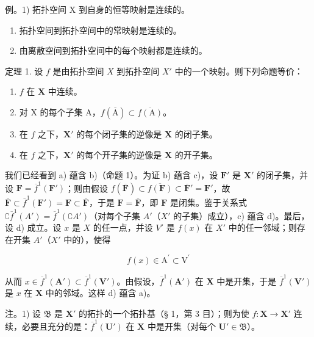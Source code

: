例。1) 拓扑空间 X 到自身的恒等映射是连续的。

\begin{enumerate}
\def\labelenumi{\arabic{enumi})}
\setcounter{enumi}{1}
\item
  拓扑空间到拓扑空间中的常映射是连续的。
\item
  由离散空间到拓扑空间中的每个映射都是连续的。
\end{enumerate}

定理 1. 设 \(f\) 是由拓扑空间 \(X\) 到拓扑空间 \(X'\) 中的一个映射。则下列命题等价：

\begin{enumerate}
\def\labelenumi{\alph{enumi})}
\item
  \(f\) 在 \(\mathbf{X}\) 中连续。
\item
  对 X 的每个子集 A，\(f(\overline{\mathrm{A}}) \subset \overline{f(\mathrm{A})}\)。
\item
  在 \(f\) 之下，\(\mathbf{X}'\) 的每个闭子集的逆像是 \(\mathbf{X}\) 的闭子集。
\item
  在 \(f\) 之下，\(\mathbf{X}'\) 的每个开子集的逆像是 \(\mathbf{X}\) 的开子集。
\end{enumerate}

我们已经看到 a) 蕴含 b)（命题 1）。为证 b) 蕴含 c)，设 \(\mathbf{F}'\) 是 \(\mathbf{X}'\) 的闭子集，并设 \(\mathbf{F} = \overline{f}^{1}(\mathbf{F}')\)；则由假设 \(f(\overline{\mathbf{F}}) \subset \overline{f(\mathbf{F})} \subset \overline{\mathbf{F}}' = \mathbf{F}'\)，故 \(\overline{\mathbf{F}} \subset \overline{f}^{1}(\mathbf{F}') = \mathbf{F} \subset \overline{\mathbf{F}}\)，于是 \(\mathbf{F} = \overline{\mathbf{F}}\)，即 \(\mathbf{F}\) 是闭集。鉴于关系式 \(\complement \overline{f}^{1}(A') = \overline{f}^{1}(\complement A')\)（对每个子集 \(A'\)（\(X'\) 的子集）成立），c) 蕴含 d)。最后，设 d) 成立。设 \(x\) 是 \(X\) 的任一点，并设 \(V'\) 是 \(f(x)\) 在 \(X'\) 中的任一邻域；则存在开集 \(A'\)（\(X'\) 中的），使得

\[
f (x) \in \mathrm{A} ^ {\prime} \subset \mathrm{V} ^ {\prime}
\]

从而 \(x \in \overline{f}^1(\mathbf{A}') \subset \overline{f}^1(\mathbf{V}')\)。由假设，\(\overline{f}^1(\mathbf{A}')\) 在 \(\mathbf{X}\) 中是开集，于是 \(\overline{f}^1(\mathbf{V}')\) 是 \(x\) 在 \(\mathbf{X}\) 中的邻域。这样 d) 蕴含 a)。

注。1) 设 \(\mathfrak{B}\) 是 \(\mathbf{X}'\) 的拓扑的一个拓扑基（§ 1，第 3 目）；则为使 \(f: \mathbf{X} \to \mathbf{X}'\) 连续，必要且充分的是：\(\overline{f}^1(\mathbf{U}')\) 在 \(\mathbf{X}\) 中是开集（对每个 \(\mathbf{U}' \in \mathfrak{B}\)）。

